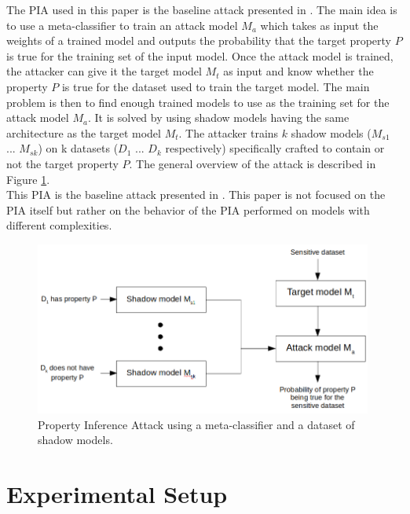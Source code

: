 \documentclass[11pt]{article}
\begin{document}
The PIA used in this paper is the baseline attack presented in \cite{Ganju2018}. The main idea is to use a meta-classifier to train an attack model $M_a$ which takes as input the weights of a trained model and outputs the probability that the target property $P$ is true for the training set of the input model. Once the attack model is trained, the attacker can give it the target model $M_t$ as input and know whether the property $P$ is true for the dataset used to train the target model. The main problem is then to find enough trained models to use as the training set for the attack model $M_a$. It is solved by using shadow models having the same architecture as the target model $M_t$. The attacker trains $k$ shadow models ($M_{s1}$ ... $M_{sk}$) on k datasets ($D_1$ ... $D_k$ respectively) specifically crafted to contain or not the target property $P$. The general overview of the attack is described in Figure \ref{pia_diagram}.\\
This PIA is the baseline attack presented in \cite{Ganju2018}. This paper is not focused on the PIA itself but rather on the behavior of the PIA performed on models with different complexities. \\ %

\begin{figure}[h]
    \centering
    \begin{minipage}{\textwidth}
        \centering
        \includegraphics[width=0.99\textwidth]{pia_diagram2.png} %
        \caption{Property Inference Attack using a meta-classifier and a dataset of shadow models.}
        \label{pia_diagram}
    \end{minipage}\hfill
\end{figure}

\section{Experimental Setup}
\end{document}
